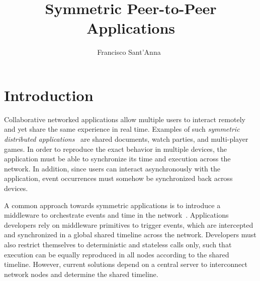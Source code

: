 \documentclass[10pt,journal,compsoc]{IEEEtran}
\begin{document}
\title{
    Symmetric Peer-to-Peer Applications
}

\author{
    Francisco Sant'Anna~
}


\maketitle


\section{Introduction}
\label{sec.introduction}

Collaborative networked applications allow multiple users to interact
remotely and yet share the same experience in real time.
Examples of such \emph{symmetric distributed applications}~\cite{gals}
are shared documents, watch parties, and multi-player games.
%
In order to reproduce the exact behavior in multiple devices, the application
must be able to synchronize its time and execution across the network.
In addition, since users can interact asynchronously with the application,
event occurrences must somehow be synchronized back across devices.

A common approach towards symmetric applications is to introduce a middleware
to orchestrate events and time in the network~\cite{gals,croquet}.
Applications developers rely on middleware primitives to trigger events, which
are intercepted and synchronized in a global shared timeline across the
network.
Developers must also restrict themselves to deterministic and stateless calls
only, such that execution can be equally reproduced in all nodes according to
the shared timeline.
However, current solutions depend on a central server to interconnect network
nodes and determine the shared timeline.
\end{document}

